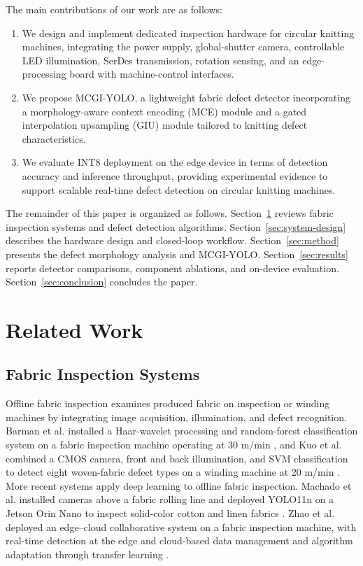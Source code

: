 \documentclass[a4paper,fleqn]{cas-dc}
\newcommand{\model}{MCGI-YOLO\xspace}
\begin{document}
The main contributions of our work are as follows:
\begin{enumerate}
  \renewcommand{\labelenumi}{\arabic{enumi})}
  \item We design and implement dedicated inspection hardware for circular knitting machines, integrating the power supply, global-shutter camera, controllable LED illumination, SerDes transmission, rotation sensing, and an edge-processing board with machine-control interfaces.
  \item We propose \model, a lightweight fabric defect detector incorporating a morphology-aware context encoding (MCE) module and a gated interpolation upsampling (GIU) module tailored to knitting defect characteristics.
  \item We evaluate INT8 deployment on the edge device in terms of detection accuracy and inference throughput, providing experimental evidence to support scalable real-time defect detection on circular knitting machines.
\end{enumerate}

The remainder of this paper is organized as follows. Section~\ref{sec:related-work} reviews fabric inspection systems and defect detection algorithms. Section~\ref{sec:system-design} describes the hardware design and closed-loop workflow. Section~\ref{sec:method} presents the defect morphology analysis and \model. Section~\ref{sec:results} reports detector comparisons, component ablations, and on-device evaluation. Section~\ref{sec:conclusion} concludes the paper.

\section{Related Work}
\label{sec:related-work}
\subsection{Fabric Inspection Systems}
Offline fabric inspection examines produced fabric on inspection or winding machines by integrating image acquisition, illumination, and defect recognition. Barman et al. installed a Haar-wavelet processing and random-forest classification system on a fabric inspection machine operating at 30 m/min \cite{barman2022inspectionmachine}, and Kuo et al. combined a CMOS camera, front and back illumination, and SVM classification to detect eight woven-fabric defect types on a winding machine at 20 m/min \cite{kuo2022woveninspection}. More recent systems apply deep learning to offline fabric inspection. Machado et al. installed cameras above a fabric rolling line and deployed YOLO11n on a Jetson Orin Nano to inspect solid-color cotton and linen fabrics \cite{machado2025edgefabric}. Zhao et al. deployed an edge--cloud collaborative system on a fabric inspection machine, with real-time detection at the edge and cloud-based data management and algorithm adaptation through transfer learning \cite{zhao2020edgecloud}.
\end{document}
